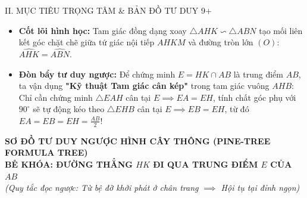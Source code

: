\documentclass[11pt,a4paper]{article}
\begin{document}
\begin{pedagogybox}{II. MỤC TIÊU TRỌNG TÂM \& BẢN ĐỒ TƯ DUY 9+}
\begin{itemize}[leftmargin=*, nosep]
    \item \textbf{Cốt lõi hình học:} Tam giác đồng dạng xoay $\triangle AHK \backsim \triangle ABN$ tạo mối liên kết góc chặt chẽ giữa tứ giác nội tiếp $AHKM$ và đường tròn lớn $(O)$: $\widehat{AHK} = \widehat{ABN}$.
    \item \textbf{Đòn bẩy tư duy ngược:} Để chứng minh $E = HK \cap AB$ là trung điểm $AB$, ta vận dụng \textbf{"Kỹ thuật Tam giác cân kép"} trong tam giác vuông $AHB$: Chỉ cần chứng minh $\triangle EAH$ cân tại $E \implies EA = EH$, tính chất góc phụ với $90^\circ$ sẽ tự động kéo theo $\triangle EHB$ cân tại $E \implies EB = EH$, từ đó $EA = EB = EH = \frac{AB}{2}$!
\end{itemize}
\end{pedagogybox}

\newpage

\begin{center}
    {\Large\bfseries\color{blue!80!black} SƠ ĐỒ TƯ DUY NGƯỢC HÌNH CÂY THÔNG (PINE-TREE FORMULA TREE)}\\[1.5mm]
    {\large\bfseries BẺ KHÓA: ĐƯỜNG THẲNG $HK$ ĐI QUA TRUNG ĐIỂM $E$ CỦA $AB$}\\[1mm]
    \textit{(Quy tắc đọc ngược: Từ bệ đỡ khởi phát ở chân trang $\implies$ Hội tụ tại đỉnh ngọn)}
\end{center}

\vspace{1mm}
\end{document}
